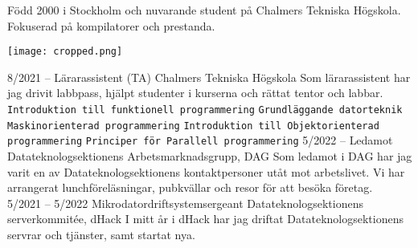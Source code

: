 \documentclass[9pt]{developercv} %
\begin{document}
\vspace{0.5cm}



\begin{minipage}[t]{0.8\textwidth} %
	\vspace{-\baselineskip} %

	Född 2000 i Stockholm och nuvarande student på Chalmers Tekniska
	Högskola. \\Fokuserad på kompilatorer och prestanda.
\end{minipage}
\hfill %
\begin{minipage}[t]{0.2\textwidth} %
	\vspace{-\baselineskip} %
	\texttt{[image: cropped.png]}
\end{minipage}



\begin{entrylist}
	\entry
		{8/2021 -- }
		{Lärarassistent (TA)}
		{Chalmers Tekniska Högskola}
		{
			Som lärarassistent har jag drivit labbpass, hjälpt studenter i
			kurserna och rättat tentor och labbar.\\
			\texttt{Introduktion till funktionell programmering}\slashsep
			\texttt{Grundläggande datorteknik}\slashsep
			\texttt{Maskinorienterad programmering}\slashsep
			\texttt{Introduktion till Objektorienterad programmering}\slashsep
			\texttt{Principer för Parallell programmering}
		}
	\entry
		{5/2022 -- }
		{Ledamot}
		{Datateknologsektionens Arbetsmarknadsgrupp, DAG}
		{Som ledamot i DAG har jag varit en av Datateknologsektionens
		kontaktpersoner utåt mot arbetslivet. Vi har arrangerat
		lunchföreläsningar, pubkvällar och resor för att besöka
		företag.\\}
	\entry
		{5/2021 -- 5/2022}
		{Mikrodatordriftsystemsergeant}
		{Datateknologsektionens serverkommitée, dHack}
		{I mitt år i dHack har jag driftat Datateknologsektionens
		servrar och tjänster, samt startat nya.\\}
\end{entrylist}
\end{document}
